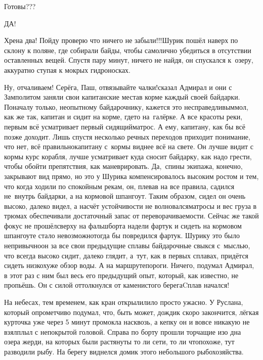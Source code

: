 \mdash Готовы???

\mdash ДА!

\mdash Хрена два! Пойду проверю что ничего не забыли!!!\mdash Шурик пошёл наверх по склону к поляне, где собирали байды, чтобы самолично убедиться в отсутствии оставленных вещей. Спустя пару минут, ничего не найдя, он спускался к~озеру, аккуратно ступая к мокрых гидроносках.

\mdash Ну, отчаливаем! Серёга, Паш, отвязывайте чалки!\mdash сказал Адмирал и они с Замполитом заняли свои капитанские места\mdash в корме каждый своей байдарки. Поначалу только, неопытному байдарочнику, кажется это несправедливым\mdash мол, как же так, капитан и сидит на корме, где\sdash то на~галёрке. А все красоты реки, первым всё усматривает первый сидящий\mdash матрос. А ему, капитану, как бы всё позже доходит. Лишь спустя несколько речных переходов приходит понимание, что нет, всё правильно\mdash капитану с~кормы виднее всё на свете. Он лучше видит с кормы курс корабля, лучше усматривает куда сносит байдарку, как надо грести, чтобы обойти препятствия, как маневрировать. Да,~спины экипажа, конечно, закрывают вид прямо, но это у Шурика компенсировалось высоким ростом и тем, что когда ходили по спокойным рекам, он, плевав на все правила, садился не~внутрь байдарки, а на кормовой шпангоут. Таким образом, сидел он очень высоко, далеко видел, а насчёт устойчивости не волновался\mdash матросы и вес груза в трюмах обеспечивали достаточный запас от переворачиваемости. Сейчас же такой фокус не прошёл\mdash сверху на фальшборта надели фартук и сидеть на кормовом шпангоуте стало невозможно\mdash тогда бы повредился фартук. Шурику это было непривычно\mdash он за все свои предыдущие сплавы байдарочные свыкся с~мыслью, что всегда высоко сидит, далеко глядит, а~тут, как в первых сплавах, придётся сидеть низко\mdash хуже обзор воды. А на маршруте\mdash пороги. Ничего, подумал Адмирал, в этот раз с ним был весь его предыдущий опыт, который, как известно, не пропьёшь. Он с силой оттолкнулся от каменистого берега\mdash Cплав начался!

На небесах, тем временем, как кран открыли\mdash лило просто ужасно. У Руслана, который опрометчиво подумал, что, быть может, дождик скоро закончится, лёгкая курточка уже через 5 минут промокла насквозь, а кепку он и вовсе никакую не взял\mdash плыл с непокрытой головой. Справа по борту прошли торчащие изо дна озера жерди, на которых были растянуты то ли сети, то ли что\mdash похоже, тут разводили рыбу. На берегу виднелся домик этого небольшого рыбохозяйства.


